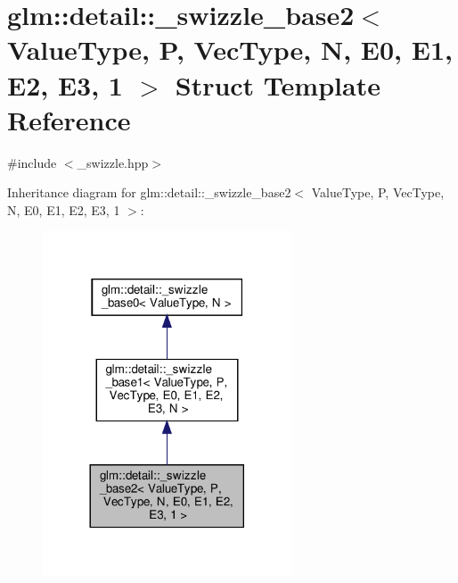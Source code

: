 \hypertarget{structglm_1_1detail_1_1__swizzle__base2_3_01_value_type_00_01_p_00_01_vec_type_00_01_n_00_01_e0_fc19218d69dc8988a4a57fbe7f79725c}{}\section{glm\+:\+:detail\+:\+:\+\_\+swizzle\+\_\+base2$<$ Value\+Type, P, Vec\+Type, N, E0, E1, E2, E3, 1 $>$ Struct Template Reference}
\label{structglm_1_1detail_1_1__swizzle__base2_3_01_value_type_00_01_p_00_01_vec_type_00_01_n_00_01_e0_fc19218d69dc8988a4a57fbe7f79725c}


{\ttfamily \#include $<$\+\_\+swizzle.\+hpp$>$}



Inheritance diagram for glm\+:\+:detail\+:\+:\+\_\+swizzle\+\_\+base2$<$ Value\+Type, P, Vec\+Type, N, E0, E1, E2, E3, 1 $>$\+:\nopagebreak
\begin{figure}[H]
\begin{center}
\leavevmode
\includegraphics[width=209pt]{structglm_1_1detail_1_1__swizzle__base2_3_01_value_type_00_01_p_00_01_vec_type_00_01_n_00_01_e0_a4c3fc91caa41118dd04a1386ed6761d}
\end{center}
\end{figure}


